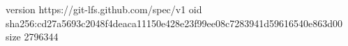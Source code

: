 version https://git-lfs.github.com/spec/v1
oid sha256:cd27a5693c2048f4deaca11150e428e23f99ee08c7283941d59616540e863d00
size 2796344
